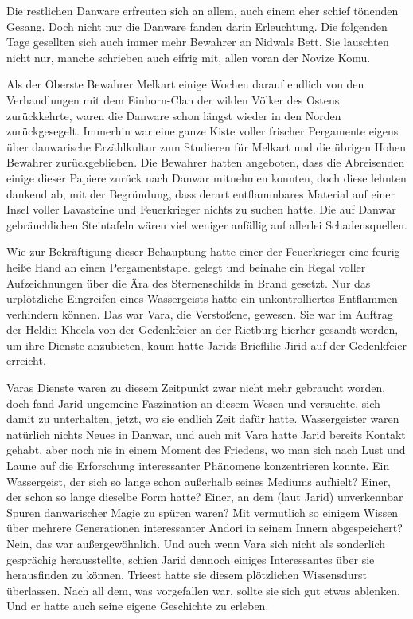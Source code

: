 Die restlichen Danware erfreuten sich an allem, auch einem eher schief tönenden Gesang. Doch nicht nur die Danware fanden darin Erleuchtung. Die folgenden Tage gesellten sich auch immer mehr Bewahrer an Nidwals Bett. Sie lauschten nicht nur, manche schrieben auch eifrig mit, allen voran der Novize Komu.

Als der Oberste Bewahrer Melkart einige Wochen darauf endlich von den Verhandlungen mit dem Einhorn-Clan der wilden Völker des Ostens zurückkehrte, waren die Danware schon längst wieder in den Norden zurückgesegelt. Immerhin war eine ganze Kiste voller frischer Pergamente eigens über danwarische Erzählkultur zum Studieren für Melkart und die übrigen Hohen Bewahrer zurückgeblieben. Die Bewahrer hatten angeboten, dass die Abreisenden einige dieser Papiere zurück nach Danwar mitnehmen konnten, doch diese lehnten dankend ab, mit der Begründung, dass derart entflammbares Material auf einer Insel voller Lavasteine und Feuerkrieger nichts zu suchen hatte. Die auf Danwar gebräuchlichen Steintafeln wären viel weniger anfällig auf allerlei Schadensquellen.

Wie zur Bekräftigung dieser Behauptung hatte einer der Feuerkrieger eine feurig heiße Hand an einen Pergamentstapel gelegt und beinahe ein Regal voller Aufzeichnungen über die Ära des Sternenschilds in Brand gesetzt. Nur das urplötzliche Eingreifen eines Wassergeists hatte ein unkontrolliertes Entflammen verhindern können. Das war Vara, die Verstoßene, gewesen. Sie war im Auftrag der Heldin Kheela von der Gedenkfeier an der Rietburg hierher gesandt worden, um ihre Dienste anzubieten, kaum hatte Jarids Brieflilie Jirid auf der Gedenkfeier erreicht.

Varas Dienste waren zu diesem Zeitpunkt zwar nicht mehr gebraucht worden, doch fand Jarid ungemeine Faszination an diesem Wesen und versuchte, sich damit zu unterhalten, jetzt, wo sie endlich Zeit dafür hatte. Wassergeister waren natürlich nichts Neues in Danwar, und auch mit Vara hatte Jarid bereits Kontakt gehabt, aber noch nie in einem Moment des Friedens, wo man sich nach Lust und Laune auf die Erforschung interessanter Phänomene konzentrieren konnte. Ein Wassergeist, der sich so lange schon außerhalb seines Mediums aufhielt? Einer, der schon so lange dieselbe Form hatte? Einer, an dem (laut Jarid) unverkennbar Spuren danwarischer Magie zu spüren waren? Mit vermutlich so einigem Wissen über mehrere Generationen interessanter Andori in seinem Innern abgespeichert? Nein, das war außergewöhnlich. Und auch wenn Vara sich nicht als sonderlich gesprächig herausstellte, schien Jarid dennoch einiges Interessantes über sie herausfinden zu können. Trieest hatte sie diesem plötzlichen Wissensdurst überlassen. Nach all dem, was vorgefallen war, sollte sie sich gut etwas ablenken. Und er hatte auch seine eigene Geschichte zu erleben.

